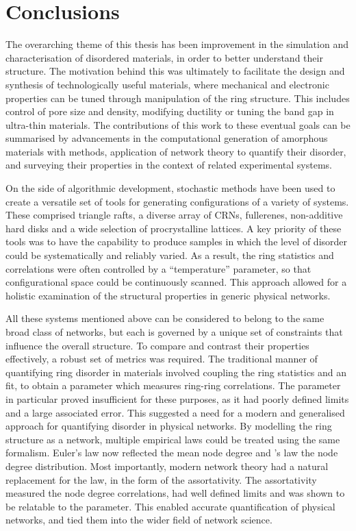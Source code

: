 \chapter[\,Conclusions]{Conclusions}
\label{ch:conclusions}

The overarching theme of this thesis has been improvement in the simulation and characterisation of \td{} disordered materials, in order to better understand their structure.
The motivation behind this was ultimately to facilitate the design and synthesis of technologically useful materials, where mechanical and electronic properties can be tuned through manipulation of the ring structure.
This includes control of pore size and density, modifying ductility or tuning the band gap in ultra\--thin materials.
The contributions of this work to these eventual goals can be summarised by advancements in the computational generation of amorphous materials with \mc{} methods, application of network theory to quantify their disorder, and surveying their properties in the context of related experimental systems.

On the side of algorithmic development, stochastic methods have been used to create a versatile set of tools for generating configurations of a variety of \td{} systems.
These comprised triangle rafts, a diverse array of CRNs, fullerenes, non\--additive hard disks and a wide selection of procrystalline lattices.
A key priority of these tools was to have the capability to produce samples in which the level of disorder could be systematically and reliably varied.
As a result, the ring statistics and correlations were often controlled by a ``temperature'' parameter, so that configurational space could be continuously scanned.
This approach allowed for a holistic examination of the structural properties in generic physical networks. 

All these systems mentioned above can be considered to belong to the same broad class of \td{} networks, but each is governed by a unique set of constraints that influence the overall structure.
To compare and contrast their properties effectively, a robust set of metrics was required.
The traditional manner of quantifying ring disorder in \td{} materials involved coupling the ring statistics and an \aw{} fit, to obtain a parameter which measures ring\--ring correlations.
The \aw{} parameter in particular proved insufficient for these purposes, as it had poorly defined limits and a large associated error.
This suggested a need for a modern and generalised approach for quantifying disorder in physical \td{} networks.
By modelling the ring structure as a network, multiple empirical laws could be treated using the same formalism.
Euler's law now reflected the mean node degree and \lm's law the node degree distribution.
Most importantly, modern network theory had a natural replacement for the \aw{} law, in the form of the assortativity.
The assortativity measured the node degree correlations, had well defined limits and was shown to be relatable to the \aw{} parameter.
This enabled accurate quantification of physical networks, and tied them into the wider field of network science.

